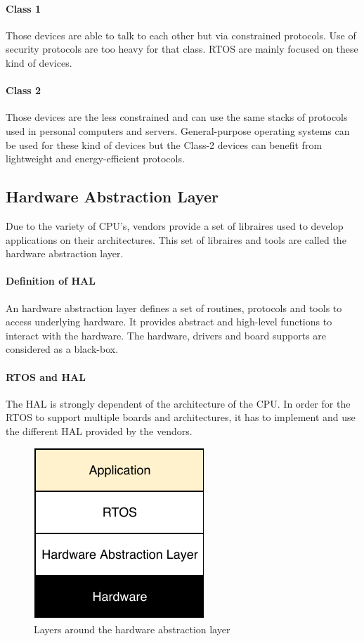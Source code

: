 \paragraph{Class 1}
Those devices are able to talk to each other but via constrained protocols.
Use of security protocols are too heavy for that class.
RTOS are mainly focused on these kind of devices.

\paragraph{Class 2}
Those devices are the less constrained and can use the same stacks of protocols used in personal computers and servers.
General-purpose operating systems can be used for these kind of devices but the Class-2 devices can benefit from lightweight and energy-efficient protocols.

\subsection{Hardware Abstraction Layer}

Due to the variety of CPU's, vendors provide a set of libraires used to develop applications on their architectures.
This set of libraires and tools are called the hardware abstraction layer.

\paragraph{Definition of HAL}
An hardware abstraction layer defines a set of routines, protocols and tools to access underlying hardware.
It provides abstract and high-level functions to interact with the hardware.
The hardware, drivers and board supports are considered as a black-box.

\paragraph{RTOS and HAL}
The HAL is strongly dependent of the architecture of the CPU.
In order for the RTOS to support multiple boards and architectures, it has to implement and use the different HAL provided by the vendors.

\begin{figure}[!h]
  \centering
  \includegraphics[scale=1]{assets/hal-layers.pdf}
  \caption{\label{fig:hal-layer}Layers around the hardware abstraction layer}
\end{figure}

